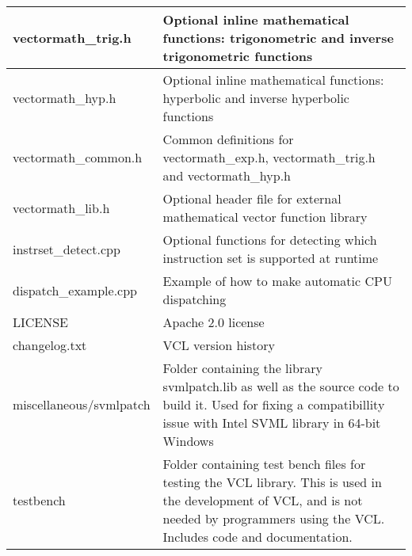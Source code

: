 \documentclass[vcl_manual.tex]{subfiles}
\begin{document}
\begin{longtable}[l]{|p{40mm}|p{100mm}|}
vectormath\_trig.h & Optional inline mathematical functions: trigonometric and inverse trigonometric functions \\ \hline

vectormath\_hyp.h & Optional inline mathematical functions: hyperbolic and inverse hyperbolic functions \\ \hline

vectormath\_common.h & Common definitions for vectormath\_exp.h, vectormath\_trig.h and vectormath\_hyp.h \\ \hline

vectormath\_lib.h & Optional header file for external mathematical vector function library \\ \hline

instrset\_detect.cpp & Optional functions for detecting which instruction set is supported at runtime \\ \hline

dispatch\_example.cpp & Example of how to make automatic CPU dispatching \\ \hline

LICENSE & Apache 2.0 license \\ \hline

changelog.txt & VCL version history \\ \hline

miscellaneous/svmlpatch & Folder containing the library svmlpatch.lib as well as the source code to build it. Used for fixing a compatibillity issue with Intel SVML library in 64-bit Windows \\ \hline

testbench & Folder containing test bench files for testing the VCL library. This is used in the development of VCL, and is not needed by programmers using the VCL. Includes code and documentation. \\ \hline

\end{longtable}
\end{document}
